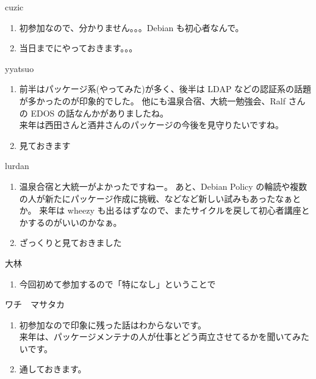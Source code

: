 \documentclass[mingoth,a4paper]{jsarticle}
\begin{document}
\begin{multicols}{2}
\begin{prework}{ cuzic }
  \begin{enumerate}
  \item 初参加なので、分かりません。。。Debian も初心者なんで。
  \item 当日までにやっておきます。。。
  \end{enumerate}
\end{prework}\vfill

\begin{prework}{ yyatsuo }
  \begin{enumerate}
  \item 前半はパッケージ系(やってみた)が多く、後半は LDAP などの認証系の話題が多かったのが印象的でした。
    他にも温泉合宿、大統一勉強会、Ralf さんの EDOS の話なんかがありましたね。\\
    来年は西田さんと酒井さんのパッケージの今後を見守りたいですね。
  \item 見ておきます
  \end{enumerate}
\end{prework}\vfill

\begin{prework}{ lurdan }
  \begin{enumerate}
  \item 温泉合宿と大統一がよかったですねー。
    あと、Debian Policy の輪読や複数の人が新たにパッケージ作成に挑戦、などなど新しい試みもあったなぁとか。
    来年は wheezy も出るはずなので、またサイクルを戻して初心者講座とかするのがいいのかなぁ。
  \item ざっくりと見ておきました
  \end{enumerate}
\end{prework}\vfill

\begin{prework}{ 大林 }
  \begin{enumerate}
  \item 今回初めて参加するので「特になし」ということで
  \end{enumerate}
\end{prework}\vfill

\begin{prework}{ ワチ　マサタカ }
  \begin{enumerate}
  \item 初参加なので印象に残った話はわからないです。\\
    来年は、パッケージメンテナの人が仕事とどう両立させてるかを聞いてみたいです。
  \item 通しておきます。
  \end{enumerate}
\end{prework}\vfill


\end{multicols}
\end{document}

